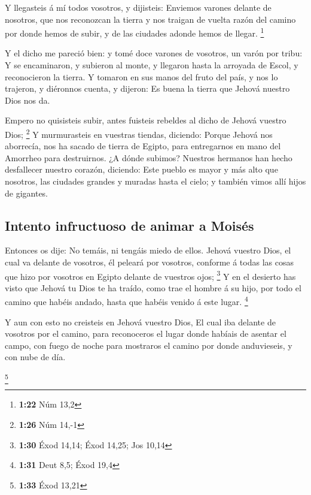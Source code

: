  Y llegasteis á mí todos vosotros, y dijisteis: Enviemos
varones delante de nosotros, que nos reconozcan la tierra y nos traigan
de vuelta razón del camino por donde hemos de subir, y de las ciudades
adonde hemos de llegar. \footnote{\textbf{1:22} Núm 13,2}

 Y el dicho me pareció bien: y tomé doce varones de
vosotros, un varón por tribu:  Y se encaminaron, y subieron
al monte, y llegaron hasta la arroyada de Escol, y reconocieron la
tierra.  Y tomaron en sus manos del fruto del país, y nos
lo trajeron, y diéronnos cuenta, y dijeron: Es buena la tierra que
Jehová nuestro Dios nos da.

 Empero no quisisteis subir, antes fuisteis rebeldes al
dicho de Jehová vuestro Dios; \footnote{\textbf{1:26} Núm 14,-1}
 Y murmurasteis en vuestras tiendas, diciendo: Porque
Jehová nos aborrecía, nos ha sacado de tierra de Egipto, para
entregarnos en mano del Amorrheo para destruirnos.  ¿A
dónde subimos? Nuestros hermanos han hecho desfallecer nuestro corazón,
diciendo: Este pueblo es mayor y más alto que nosotros, las ciudades
grandes y muradas hasta el cielo; y también vimos allí hijos de
gigantes.

\hypertarget{intento-infructuoso-de-animar-a-moisuxe9s}{%
\subsection{Intento infructuoso de animar a
Moisés}\label{intento-infructuoso-de-animar-a-moisuxe9s}}

 Entonces os dije: No temáis, ni tengáis miedo de ellos.
 Jehová vuestro Dios, el cual va delante de vosotros, él
peleará por vosotros, conforme á todas las cosas que hizo por vosotros
en Egipto delante de vuestros ojos; \footnote{\textbf{1:30} Éxod 14,14;
  Éxod 14,25; Jos 10,14}  Y en el desierto has visto que
Jehová tu Dios te ha traído, como trae el hombre á su hijo, por todo el
camino que habéis andado, hasta que habéis venido á este lugar.
\footnote{\textbf{1:31} Deut 8,5; Éxod 19,4}

 Y aun con esto no creisteis en Jehová vuestro Dios,
 El cual iba delante de vosotros por el camino, para
reconoceros el lugar donde habíais de asentar el campo, con fuego de
noche para mostraros el camino por donde anduvieseis, y con nube de día.

\footnote{\textbf{1:33} Éxod 13,21}

